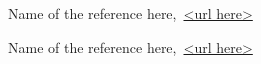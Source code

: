\cleardoublepage
{}
{}
\begin{thebibliography}{99}

Name of the reference here,\ \url{<url here>}

Name of the reference here,\ \url{<url here>}

\end{thebibliography}
